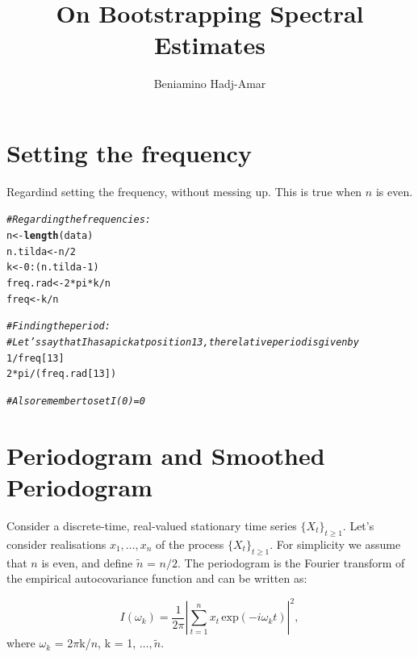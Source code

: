 \documentclass{article}\usepackage[]{graphicx}\usepackage[]{color}
\title{\textbf{On Bootstrapping Spectral Estimates}}
\author{Beniamino Hadj-Amar}
\makeatletter
\newcommand{\hlnum}[1]{\textcolor[rgb]{0.686,0.059,0.569}{#1}}%
\newcommand{\hlcom}[1]{\textcolor[rgb]{0.678,0.584,0.686}{\textit{#1}}}%
\newcommand{\hlopt}[1]{\textcolor[rgb]{0,0,0}{#1}}%
\newcommand{\hlstd}[1]{\textcolor[rgb]{0.345,0.345,0.345}{#1}}%
\newcommand{\hlkwb}[1]{\textcolor[rgb]{0.69,0.353,0.396}{#1}}%
\newcommand{\hlkwd}[1]{\textcolor[rgb]{0.737,0.353,0.396}{\textbf{#1}}}%
\newenvironment{kframe}{%
 \def\at@end@of@kframe{}%
 \ifinner\ifhmode%
  \def\at@end@of@kframe{\end{minipage}}%
  \begin{minipage}{\columnwidth}%
 \fi\fi%
 \def\FrameCommand##1{\hskip\@totalleftmargin \hskip-\fboxsep
 \colorbox{shadecolor}{##1}\hskip-\fboxsep
     \hskip-\linewidth \hskip-\@totalleftmargin \hskip\columnwidth}%
 \MakeFramed {\advance\hsize-\width
   \@totalleftmargin\z@ \linewidth\hsize
   \@setminipage}}%
 {\par\unskip\endMakeFramed%
 \at@end@of@kframe}
\newenvironment{knitrout}{}{} %
\makeatother
\begin{document}
\maketitle

\renewenvironment{knitrout}{\vspace{1em}}{\vspace{1em}}



\section*{Setting the frequency}
Regardind setting the frequency, without messing up. This is true when $n$ is even.
\begin{knitrout}\footnotesize
{}\color{fgcolor}\begin{kframe}
\begin{alltt}
\hlcom{# Regarding the frequencies:}
\hlstd{n} \hlkwb{<-} \hlkwd{length}\hlstd{(data)}
\hlstd{n.tilda} \hlkwb{<-} \hlstd{n}\hlopt{/}\hlnum{2}
\hlstd{k} \hlkwb{<-} \hlnum{0}\hlopt{:}\hlstd{(n.tilda} \hlopt{-} \hlnum{1}\hlstd{)}
\hlstd{freq.rad} \hlkwb{<-} \hlnum{2}\hlopt{*}\hlstd{pi}\hlopt{*}\hlstd{k}\hlopt{/}\hlstd{n}
\hlstd{freq} \hlkwb{<-} \hlstd{k}\hlopt{/}\hlstd{n}

\hlcom{# Finding the period:}
\hlcom{# Let's say that I has a pick at position 13, the relative period is given by}
\hlnum{1}\hlopt{/}\hlstd{freq[}\hlnum{13}\hlstd{]}
\hlnum{2}\hlopt{*}\hlstd{pi}\hlopt{/}\hlstd{(freq.rad[}\hlnum{13}\hlstd{])}

\hlcom{# Also remember to set I(0) = 0}
\end{alltt}
\end{kframe}
\end{knitrout}


\section{Periodogram and Smoothed Periodogram}

Consider a discrete-time, real-valued stationary time series $\{X_t\}_{t \geq 1}$. Let's consider realisations $x_1, \dots, x_n$ of the process $\{X_t\}_{t \geq 1}$. For simplicity we assume that $n$ is even, and define $\widetilde{n}$ = $n/2$.
The periodogram is the Fourier transform of the empirical autocovariance function and can be written as:

\begin{equation*}
I(\omega_k) = \dfrac{1}{2\pi} | \sum_{t = 1}^{n} x_t \, \text{exp}(-i \omega_k t) |^2,
\end{equation*}
where $\omega_k$ = 2$\pi$k/$n$, k = 1, $\dots, \widetilde{n}$.
\end{document}
